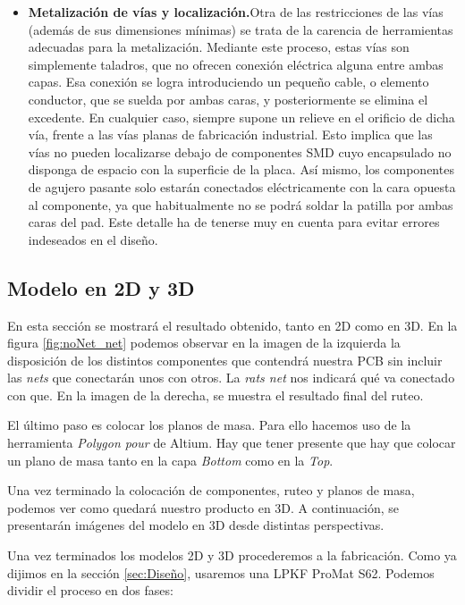 \begin{itemize}
	\item \textbf{Metalización de vías y localización.}Otra de las restricciones de las vías (además
de sus dimensiones mínimas) se trata de la carencia de herramientas adecuadas para
la metalización. Mediante este proceso, estas vías son simplemente taladros, que
no ofrecen conexión eléctrica alguna entre ambas capas. Esa conexión se logra introduciendo
un pequeño cable, o elemento conductor, que se suelda por ambas caras, y
posteriormente se elimina el excedente. En cualquier caso, siempre supone un relieve
en el orificio de dicha vía, frente a las vías planas de fabricación industrial. Esto implica
que las vías no pueden localizarse debajo de componentes \acrshort{SMD} cuyo encapsulado
no disponga de espacio con la superficie de la placa. Así mismo, los componentes de
agujero pasante solo estarán conectados eléctricamente con la cara opuesta al componente,
ya que habitualmente no se podrá soldar la patilla por ambas caras del pad.
Este detalle ha de tenerse muy en cuenta para evitar errores indeseados en el diseño.
\end{itemize}

\subsection{Modelo en 2D y 3D}
En esta sección se mostrará el resultado obtenido, tanto en 2D como en 3D. En la figura \ref{fig:noNet_net} podemos observar en la imagen de la izquierda la disposición de los distintos componentes que contendrá nuestra \acrshort{PCB} sin incluir las \textit{nets} que conectarán unos con otros. La \textit{rats net} nos indicará qué va conectado con que. En la imagen de la derecha,  se muestra el resultado final del ruteo.




El último paso es colocar los planos de masa. Para ello hacemos uso de la herramienta \textit{Polygon pour} de Altium. Hay que tener presente que hay que colocar un plano de masa tanto en la capa \textit{Bottom} como en la \textit{Top}.


Una vez terminado la colocación de componentes, ruteo y planos de masa, podemos ver como quedará nuestro producto en 3D. A continuación, se presentarán imágenes del modelo en 3D desde distintas perspectivas. 

Una vez terminados los modelos 2D y 3D procederemos a la fabricación. Como ya dijimos en la sección \ref{sec:Diseño}, usaremos una LPKF ProMat S62. Podemos dividir el proceso en dos fases:

